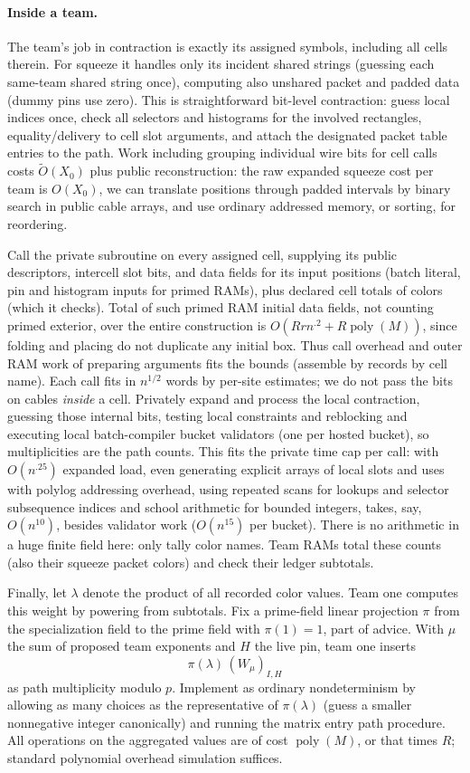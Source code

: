 \documentclass[11pt,letterpaper]{article}
\theoremstyle{definition}
\numberwithin{equation}{section}
\DeclareMathOperator{\poly}{poly}
\begin{document}
\paragraph{Inside a team.}
The team's job in contraction is exactly its assigned symbols, including all
cells therein. For squeeze it handles only its incident shared strings (guessing each same-team
shared string once), computing also unshared packet and padded data (dummy pins use zero).
This is straightforward bit-level contraction: guess local indices once, check all selectors and
histograms for the involved rectangles, equality/delivery to cell slot arguments, and attach
the designated packet table entries to the path. Work including grouping individual wire
bits for cell calls costs $\widetilde{O}(X_0)$ plus public reconstruction: the raw expanded squeeze cost
per team is $O(X_0)$, we can translate positions through padded intervals by binary search in
public cable arrays, and use ordinary addressed memory, or sorting, for reordering.

Call the private subroutine on every assigned cell, supplying its public descriptors,
intercell slot bits, and data fields for its input positions (batch literal, pin and histogram
inputs for primed RAMs), plus declared cell totals of colors (which it checks). Total of such
primed RAM initial data fields, not counting primed exterior, over the entire construction is
$O(Rrn^{.2}+R\poly(M))$, since folding and placing do not duplicate any initial box. Thus call
overhead and outer RAM work of preparing arguments fits the bounds (assemble by records
by cell name). Each call fits in $n^{1/2}$ words by per-site estimates; we do not pass the bits
on cables \emph{inside} a cell. Privately expand and process the local contraction, guessing those
internal bits, testing local constraints and reblocking and executing local batch-compiler
bucket validators (one per hosted bucket), so multiplicities are the path counts. This fits
the private time cap per call: with $O(n^{.25})$ expanded load, even generating explicit arrays of
local slots and uses with polylog addressing overhead, using repeated scans for lookups and
selector subsequence indices and school arithmetic for bounded integers, takes, say, $O(n^{10})$,
besides validator work ($O(n^{15})$ per bucket). There is no arithmetic in a huge finite field here:
only tally color names. Team RAMs total these counts (also their squeeze packet colors)
and check their ledger subtotals.

Finally, let $\lambda$ denote the product of all recorded color values. Team one computes
this weight by powering from subtotals. Fix a prime-field linear projection $\pi$ from the
specialization field to the prime field with $\pi(1)=1$, part of advice. With $\mu$ the sum of
proposed team exponents and $H$ the live pin, team one inserts
\[
  \pi(\lambda)\,(W_\mu)_{I,H}
\]
as path multiplicity modulo $p$. Implement as ordinary nondeterminism by allowing as many
choices as the representative of $\pi(\lambda)$ (guess a smaller nonnegative integer canonically) and
running the matrix entry path procedure. All operations on the aggregated values are of
cost $\poly(M)$, or that times $R$; standard polynomial overhead simulation suffices.
\end{document}
